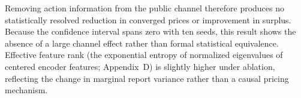 Removing action information from the public channel therefore produces no statistically resolved reduction in converged prices or improvement in surplus. Because the confidence interval spans zero with ten seeds, this result shows the absence of a large channel effect rather than formal statistical equivalence. Effective feature rank (the exponential entropy of normalized eigenvalues of centered encoder features; Appendix~D) is slightly higher under ablation, reflecting the change in marginal report variance rather than a causal pricing mechanism.

